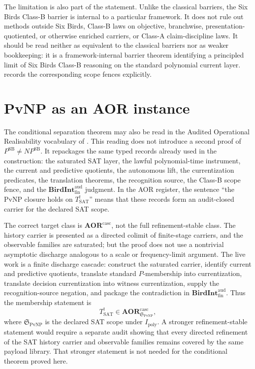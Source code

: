 \documentclass[11pt]{article}
\newcommand{\Tsat}{T^{!}_{\mathrm{SAT}}}
\newcommand{\Ipoly}{I_{\mathrm{poly}}}
\newcommand{\PSB}{P^{\mathrm{SB}}}
\newcommand{\NPSB}{NP^{\mathrm{SB}}}
\newcommand{\BirdInt}{\mathbf{BirdInt}^{\mathrm{aud}}_{\mathrm{fin}}}
\theoremstyle{definition}
\begin{document}
The limitation is also part of the statement.  Unlike the classical
barriers, the Six Birds Class-B barrier is internal to a particular
framework.  It does not rule out methods outside Six Birds, Class-B
laws on objective, branchwise, presentation-quotiented, or otherwise
enriched carriers, or Class-A claim-discipline laws.  It should be read
neither as equivalent to the classical barriers nor as weaker
bookkeeping: it is a framework-internal barrier theorem identifying a
principled limit of Six Birds Class-B reasoning on the standard
polynomial current layer.   records the corresponding
scope fences explicitly.
 

\section{PvNP as an AOR instance}
\label{sec:pvnp-aor-instance}

The conditional separation theorem may also be read in the
Audited Operational Realisability vocabulary of
\citet{Tsiokos2026AOR}.  This reading does not introduce a second
proof of \(\PSB\neq\NPSB\).  It repackages the same typed records
already used in the construction: the saturated SAT layer, the
lawful polynomial-time instrument, the current and predictive
quotients, the autonomous lift, the currentization predicates, the
translation theorems, the recognition source, the Class-B scope
fence, and the \(\BirdInt\) judgment.  In the AOR register, the
sentence ``the PvNP closure holds on \(\Tsat\)'' means that these
records form an audit-closed carrier for the declared SAT scope.

The correct target class is \(\mathbf{AOR}^{\mathrm{casc}}\), not
the full refinement-stable class.  The history carrier is presented
as a directed colimit of finite-stage carriers, and the observable
families are saturated; but the proof does not use a nontrivial
asymptotic discharge analogous to a scale or frequency-limit
argument.  The live work is a finite discharge cascade:
construct the saturated carrier, identify current and predictive
quotients, translate standard \(P\)-membership into currentization,
translate decision currentization into witness currentization, supply
the recognition-source negation, and package the contradiction in
\(\BirdInt\).  Thus the membership statement is
\[
  \Tsat \in
  \mathbf{AOR}^{\mathrm{casc}}_{\mathfrak S_{\mathrm{PvNP}}},
\]
where \(\mathfrak S_{\mathrm{PvNP}}\) is the declared SAT scope under
\(\Ipoly\).  A stronger refinement-stable statement would require a
separate audit showing that every directed refinement of the SAT
history carrier and observable families remains covered by the same
payload library.  That stronger statement is not needed for the
conditional theorem proved here.
\end{document}
